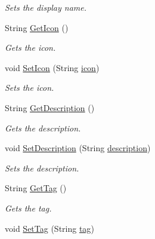 \begin{DoxyCompactItemize}
\begin{DoxyCompactList}\small\item\em Sets the display name. \end{DoxyCompactList}\item 
String \hyperlink{classcom_1_1shephertz_1_1app42_1_1paas_1_1sdk_1_1csharp_1_1gift_1_1_gift_ab77a538e4131eb5811fb7e51d5a701c2}{Get\+Icon} ()
\begin{DoxyCompactList}\small\item\em Gets the icon. \end{DoxyCompactList}\item 
void \hyperlink{classcom_1_1shephertz_1_1app42_1_1paas_1_1sdk_1_1csharp_1_1gift_1_1_gift_af2906af35159f6b64ee715453fc67282}{Set\+Icon} (String \hyperlink{classcom_1_1shephertz_1_1app42_1_1paas_1_1sdk_1_1csharp_1_1gift_1_1_gift_a890e1461198dc6f8a0afa5a0d5be91d8}{icon})
\begin{DoxyCompactList}\small\item\em Sets the icon. \end{DoxyCompactList}\item 
String \hyperlink{classcom_1_1shephertz_1_1app42_1_1paas_1_1sdk_1_1csharp_1_1gift_1_1_gift_a079453bf5786b87148b7ff1d24c5c679}{Get\+Description} ()
\begin{DoxyCompactList}\small\item\em Gets the description. \end{DoxyCompactList}\item 
void \hyperlink{classcom_1_1shephertz_1_1app42_1_1paas_1_1sdk_1_1csharp_1_1gift_1_1_gift_aed7b4e95153c8acfa5c7b3f60f42b7f4}{Set\+Description} (String \hyperlink{classcom_1_1shephertz_1_1app42_1_1paas_1_1sdk_1_1csharp_1_1gift_1_1_gift_a8c625ce83db7304c60bbec6d52fc1040}{description})
\begin{DoxyCompactList}\small\item\em Sets the description. \end{DoxyCompactList}\item 
String \hyperlink{classcom_1_1shephertz_1_1app42_1_1paas_1_1sdk_1_1csharp_1_1gift_1_1_gift_a500fe0cc06f9b6f3e81907000548fa52}{Get\+Tag} ()
\begin{DoxyCompactList}\small\item\em Gets the tag. \end{DoxyCompactList}\item 
void \hyperlink{classcom_1_1shephertz_1_1app42_1_1paas_1_1sdk_1_1csharp_1_1gift_1_1_gift_a62e3ae7b4a4ba917e72dd2ba614b166b}{Set\+Tag} (String \hyperlink{classcom_1_1shephertz_1_1app42_1_1paas_1_1sdk_1_1csharp_1_1gift_1_1_gift_a3d2e74c8a0a4ccb247b36e3bc82ec7e9}{tag})

\end{DoxyCompactItemize}
